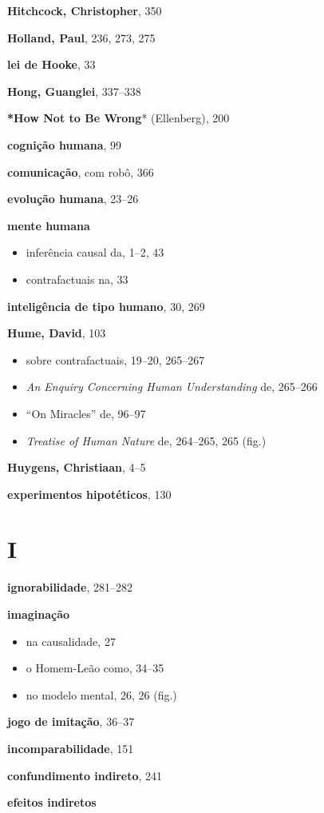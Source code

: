 \documentclass[11pt,a5paper,twoside]{book}
\begin{document}
\textbf{Hitchcock, Christopher}, 350

\textbf{Holland, Paul}, 236, 273, 275

\textbf{lei de Hooke}, 33

\textbf{Hong, Guanglei}, 337–338

\textbf{*How Not to Be Wrong}* (Ellenberg), 200

\textbf{cognição humana}, 99

\textbf{comunicação}, com robô, 366

\textbf{evolução humana}, 23–26

\textbf{mente humana}

\begin{itemize}
\item inferência causal da, 1–2, 43
\item contrafactuais na, 33
\end{itemize}
\textbf{inteligência de tipo humano}, 30, 269

\textbf{Hume, David}, 103

\begin{itemize}
\item sobre contrafactuais, 19–20, 265–267
\item \textit{An Enquiry Concerning Human Understanding} de, 265–266
\item “On Miracles” de, 96–97
\item \textit{Treatise of Human Nature} de, 264–265, 265 (fig.)
\end{itemize}
\textbf{Huygens, Christiaan}, 4–5

\textbf{experimentos hipotéticos}, 130

\section{I}
\textbf{ignorabilidade}, 281–282

\textbf{imaginação}

\begin{itemize}
\item na causalidade, 27
\item o Homem-Leão como, 34–35
\item no modelo mental, 26, 26 (fig.)
\end{itemize}
\textbf{jogo de imitação}, 36–37

\textbf{incomparabilidade}, 151

\textbf{confundimento indireto}, 241

\textbf{efeitos indiretos}
\end{document}
